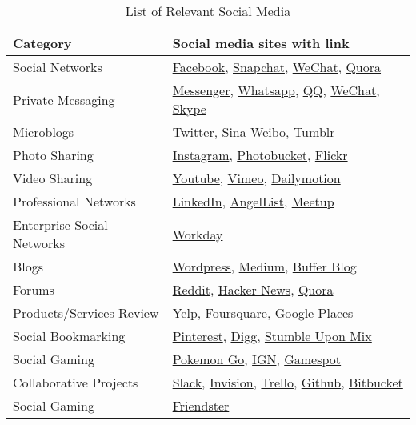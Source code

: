 \begin{table}[t]
\caption{List of Relevant Social Media}\vspace{-4mm}
{\small
\begin{tabular}{|l|l|} \hline
\textbf{Category} &  \textbf{Social media sites with link }\\\hline
Social Networks   &   \href{https://facebook.com}{Facebook}, \href{https://www.snapchat.com/}{Snapchat},  \href{https://www.wechat.com/en/}{WeChat}, \href{https://quora.com}{Quora}                     \\ \hline
Private Messaging & \href{https://messenger.com}{Messenger}, \href{https://whatsapp.com}{Whatsapp}, \href{http://www.imqq.com/}{QQ}, \href{https://www.wechat.com/en/}{WeChat}, \href{https://www.skype.com}{Skype} \\ \hline
Microblogs        &    \href{https://twitter.com}{Twitter}, \href{http://english.sina.com/weibo/}{Sina Weibo}, \href{https://tumblr.com}{Tumblr}           \\ \hline
Photo Sharing     &   \href{https://instagram.com}{Instagram}, \href{http://www.photobucket.com/}{Photobucket}, \href{https://flickr.com}{Flickr}  \\ \hline
Video Sharing     &   \href{https://www.youtube.com/}{Youtube}, \href{https://vimeo.com/}{Vimeo}, \href{https://www.dailymotion.com/us}{Dailymotion}  \\ \hline
Professional Networks &  \href{https://linkedin.com}{LinkedIn}, \href{https://angel.co/}{AngelList}, \href{http://www.meetup.com/}{Meetup}    \\ \hline
Enterprise Social Networks &  \href{https://www.workday.com/en-us/homepage.html}{Workday}   \\ \hline
Blogs             &  \href{https://wordpress.com}{Wordpress}, \href{https://medium.com}{Medium}, \href{https://buffer.com/}{Buffer Blog}   \\ \hline
Forums            &  \href{https://reddit.com}{Reddit}, \href{https://news.ycombinator.com}{Hacker News}, \href{https://quora.com}{Quora}    \\ \hline
Products/Services Review & \href{https://yelp.com}{Yelp}, \href{https://fourquare.com}{Foursquare}, \href{https://places.google.com}{Google Places} \\ \hline
Social Bookmarking &  \href{https://www.pinterest.com}{Pinterest}, \href{https://digg.com}{Digg}, \href{https://mix.com/}{Stumble Upon Mix}     \\ \hline
Social Gaming &    \href{https://www.pokemongo.com/en-us/}{Pokemon Go}, \href{https://www.ign.com/}{IGN}, \href{https://www.gamespot.com/}{Gamespot} \cite{gamestatista}       \\ \hline
Collaborative Projects &  \href{https://slack.com}{Slack}, \href{https://www.invisionapp.com/}{Invision}, \href{https://trello.com}{Trello}, \href{https://github.com}{Github}, \href{https://bitbucket.org/}{Bitbucket} \\ \hline
Social Gaming  &  \href{http://www.friendster.com/index.html}{Friendster} \\ \hline
\end{tabular}}
\label{table:social_media_list}
\end{table}


